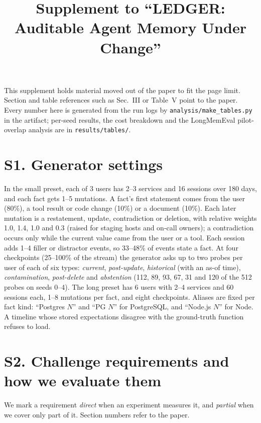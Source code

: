 \documentclass[10pt,conference]{IEEEtran}
\begin{document}
\title{Supplement to ``LEDGER: Auditable Agent Memory Under Change''}
\author{}
\maketitle

This supplement holds material moved out of the paper to fit the page limit. Section and table references such as Sec.~III or Table~V point to the paper. Every number here is generated from the run logs by \texttt{analysis/make\_tables.py} in the artifact; per-seed results, the cost breakdown and the LongMemEval pilot-overlap analysis are in \texttt{results/tables/}.

\section*{S1. Generator settings}
In the small preset, each of 3 users has 2--3 services and 16 sessions over 180 days, and each fact gets 1--5 mutations. A fact's first statement comes from the user (80\%), a tool result or code change (10\%) or a document (10\%). Each later mutation is a restatement, update, contradiction or deletion, with relative weights 1.0, 1.4, 1.0 and 0.3 (raised for staging hosts and on-call owners); a contradiction occurs only while the current value came from the user or a tool. Each session adds 1--4 filler or distractor events, so 33--48\% of events state a fact. At four checkpoints (25--100\% of the stream) the generator asks up to two probes per user of each of six types: \emph{current}, \emph{post-update}, \emph{historical} (with an as-of time), \emph{contamination}, \emph{post-delete} and \emph{abstention} (112, 89, 93, 67, 31 and 120 of the 512 probes on seeds 0--4). The long preset has 6 users with 2--4 services and 60 sessions each, 1--8 mutations per fact, and eight checkpoints. Aliases are fixed per fact kind: ``Postgres $N$'' and ``PG $N$'' for PostgreSQL, and ``Node.js $N$'' for Node. A timeline whose stored expectations disagree with the ground-truth function refuses to load.

\section*{S2. Challenge requirements and how we evaluate them}
We mark a requirement \emph{direct} when an experiment measures it, and \emph{partial} when we cover only part of it. Section numbers refer to the paper.
\end{document}
